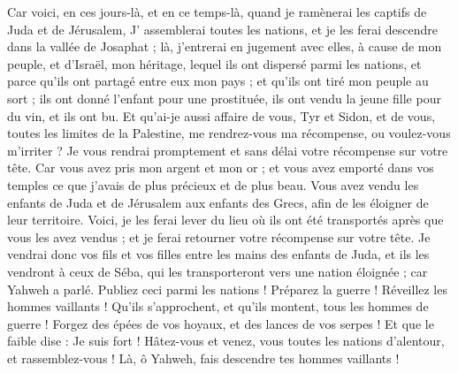 \begin{multicols}{2}
\VerseOne{}Car voici, en ces jours-là, et en ce temps-là, quand je ramènerai les captifs de Juda et de Jérusalem,
J' assemblerai toutes les nations, et je les ferai descendre dans la vallée de Josaphat ; là, j'entrerai en jugement avec elles, à cause de mon peuple, et d'Israël, mon héritage, lequel ils ont dispersé parmi les nations, et parce qu’ils ont partagé entre eux mon pays ;
et qu'ils ont tiré mon peuple au sort ; ils ont donné l’enfant pour une prostituée, ils ont vendu la jeune fille pour du vin, et ils ont bu.
Et qu’ai-je aussi affaire de vous, Tyr et Sidon, et de vous, toutes les limites de la Palestine, me rendrez-vous ma récompense, ou voulez-vous m'irriter ? Je vous rendrai promptement et sans délai votre récompense sur votre tête.
Car vous avez pris mon argent et mon or ; et vous avez emporté dans vos temples ce que j’avais de plus précieux et de plus beau.
Vous avez vendu les enfants de Juda et de Jérusalem aux enfants des Grecs, afin de les éloigner de leur territoire.
Voici, je les ferai lever du lieu où ils ont été transportés après que vous les avez vendus ; et je ferai retourner votre récompense sur votre tête.
Je vendrai donc vos fils et vos filles entre les mains des enfants de Juda, et ils les vendront à ceux de Séba, qui les transporteront vers une nation éloignée ; car Yahweh a parlé.
Publiez ceci parmi les nations ! Préparez la guerre ! Réveillez les hommes vaillants ! Qu’ils s’approchent, et qu’ils montent, tous les hommes de guerre !
Forgez des épées de vos hoyaux, et des lances de vos serpes ! Et que le faible dise : Je suis fort !
Hâtez-vous et venez, vous toutes les nations d'alentour, et rassemblez-vous ! Là, ô Yahweh, fais descendre tes hommes vaillants !

\end{multicols}

